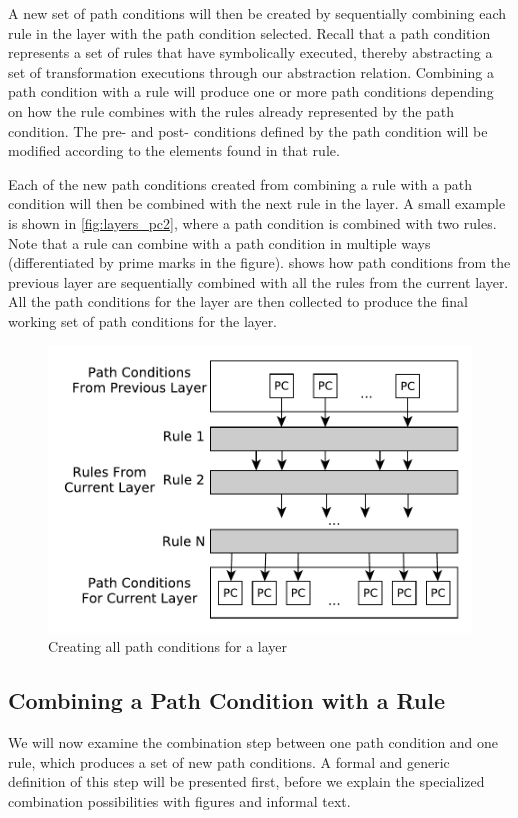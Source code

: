 A new set of path conditions will then be created by sequentially combining each rule in the layer with the path condition selected. Recall that a path condition represents a set of rules that have symbolically executed, thereby abstracting a set of transformation executions through our abstraction relation. Combining a path condition with a rule will produce one or more path conditions depending on how the rule combines with the rules already represented by the path condition. The pre- and post- conditions defined by the path condition will be modified according to the elements found in that rule. 

Each of the new path conditions created from combining a rule with a path condition will then be combined with the next rule in the layer. A small example is shown in \cref{fig:layers_pc2}, where a path condition is combined with two rules. Note that a rule can combine with a path condition in multiple ways (differentiated by prime marks in the figure).  shows how path conditions from the previous layer are sequentially combined with all the rules from the current layer. All the path conditions for the layer are then collected to produce the final working set of path conditions for the layer.

        \begin{figure}[bht]
                 \centering
                  \includegraphics[width=.38\textwidth]{./figures/overview/all_pcs.pdf}
                 \caption{Creating all path conditions for a layer}
                 \label{fig:all_pcs2}
         \end{figure}
         
\subsection{Combining a Path Condition with a Rule}
We will now examine the combination step between one path condition and one rule, which produces a set of new path conditions. A formal and generic definition of this step will be presented first, before we explain the specialized combination possibilities with figures and informal text.

